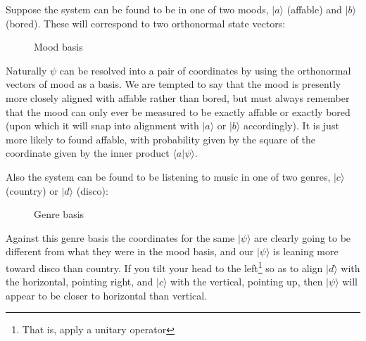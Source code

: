 Suppose the system can be found to be in one of two moods, $|a\rangle$ (affable) and $|b\rangle$ (bored). These will correspond to two orthonormal state vectors:

\begin{figure}[h]
  \centering
  \centering
  \caption{Mood basis} \label{fig:mood-basis}
\end{figure}

Naturally $\psi$ can be resolved into a pair of coordinates by using the orthonormal vectors of mood as a basis. We are tempted to say that the mood is presently more closely aligned with affable rather than bored, but must always remember that the mood can only ever be measured to be exactly affable or exactly bored (upon which it will snap into alignment with $|a\rangle$ or $|b\rangle$ accordingly). It is just more likely to found affable, with probability given by the square of the coordinate given by the inner product $\langle a|\psi \rangle$.

Also the system can be found to be listening to music in one of two genres, $|c\rangle$ (country) or $|d\rangle$ (disco):

\begin{figure}[h]
  \centering
  \centering
  \caption{Genre basis} \label{fig:genre-basis}
\end{figure}

Against this genre basis the coordinates for the same $|\psi\rangle$ are clearly going to be different from what they were in the mood basis, and our $|\psi\rangle$ is leaning more toward disco than country. If you tilt your head to the left\footnote{That is, apply a unitary operator} so as to align $|d\rangle$ with the horizontal, pointing right, and $|c\rangle$ with the vertical, pointing up, then $|\psi\rangle$ will appear to be closer to horizontal than vertical.

